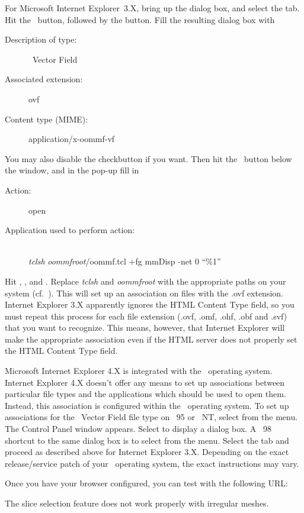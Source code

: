 For Microsoft Internet
Explorer~3.X, bring up the
 dialog box, and select the
 tab.  Hit the
\ button, followed by the
 button. Fill the resulting dialog box with
\begin{description}
\item[Description of type:] \OOMMF\ Vector Field
\item[Associated extension:] ovf
\item[Content type (MIME):] application/x-oommf-vf
\end{description}
You may also disable the  checkbutton
if you want.  Then hit the \ button below the
{} window, and in the pop-up fill in
\begin{description}
\item[Action:] open
\item[Application used to perform action:]\ \\
{\em tclsh} {\em oommfroot}/oommf.tcl {+fg} mmDisp {-net} 0 ``\%1''
\end{description}
Hit , ,  and .  Replace {\em tclsh}
and {\em oommfroot} with the appropriate paths on your system
(cf.\ ).  This will
set up an association on files with the .ovf extension. Internet
Explorer 3.X apparently ignores the HTML Content Type field, so you must
repeat this process for each file extension (.ovf, .omf, .ohf, .obf and
.svf) that you want to recognize.  This means, however, that Internet
Explorer will make the appropriate association even if the HTML server
does not properly set the HTML Content Type field.

Microsoft Internet Explorer 4.X is integrated with the \Windows\ operating
system.  Internet Explorer 4.X doesn't offer any means to set up
associations between particular file types and the applications which
should be used to open them.  Instead, this association is configured
within the \Windows\ operating system.
To set up associations for the
\OOMMF\ Vector Field file type on \Windows~95 or \Windows~NT,
select  from the  menu.
The Control Panel window appears.  Select 
to display a dialog box.
A \Windows~98 shortcut to the same dialog box is to select
 from the  menu.
Select the  tab and proceed as
described above for Internet Explorer 3.X.
Depending on the exact release/service patch of your \Windows\ operating
system, the exact instructions may vary.

Once you have your browser configured, you can test with the following
URL:
\begin{center}
\end{center}

The slice selection feature does not work properly with irregular
meshes.
%
%
